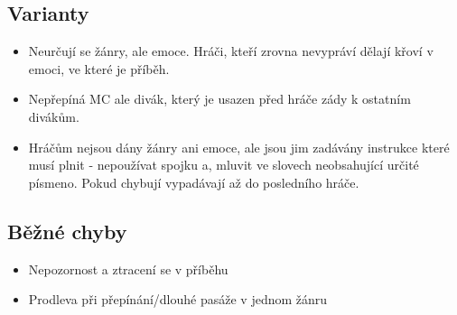 \documentclass[main.tex]{subfiles}
\begin{document}
\subsection{ Varianty } \begin{itemize}
\item  Neurčují se žánry, ale emoce. Hráči, kteří zrovna nevypráví dělají křoví v emoci, ve které je příběh.
\item  Nepřepíná MC ale divák, který je usazen před hráče zády k ostatním divákům.
\item  Hráčům nejsou dány žánry ani emoce, ale jsou jim zadávány instrukce které musí plnit - nepoužívat spojku a, mluvit ve slovech neobsahující určité písmeno. Pokud chybují vypadávají až do posledního hráče.
\end{itemize}
 
\subsection{ Běžné chyby } \begin{itemize}
\item  Nepozornost a ztracení se v příběhu
\item  Prodleva při přepínání/dlouhé pasáže v jednom žánru
\end{itemize}
 
 
 
 
 
 
\end{document}
